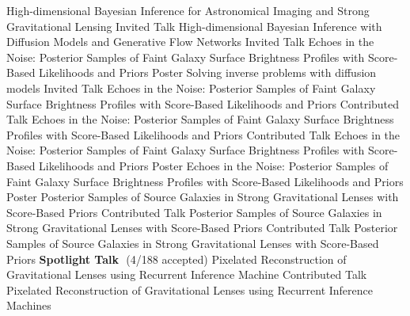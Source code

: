   {High-dimensional Bayesian Inference for Astronomical Imaging and Strong Gravitational Lensing}
  {Invited Talk}
  {High-dimensional Bayesian Inference with Diffusion Models and Generative Flow Networks}
  {Invited Talk}
  {Echoes in the Noise: Posterior Samples of Faint Galaxy Surface Brightness Profiles with Score-Based Likelihoods and Priors}
  {Poster}
  {Solving inverse problems with diffusion models}
  {Invited Talk}
  {Echoes in the Noise: Posterior Samples of Faint Galaxy Surface Brightness Profiles with Score-Based Likelihoods and Priors}
  {Contributed Talk}
  {Echoes in the Noise: Posterior Samples of Faint Galaxy Surface Brightness Profiles with Score-Based Likelihoods and Priors}
  {Contributed Talk}
  {Echoes in the Noise: Posterior Samples of Faint Galaxy Surface Brightness Profiles with Score-Based Likelihoods and Priors}
  {Poster}
  {Echoes in the Noise: Posterior Samples of Faint Galaxy Surface Brightness Profiles with Score-Based Likelihoods and Priors}
  {Poster}
  {Posterior Samples of Source Galaxies in Strong Gravitational Lenses with Score-Based Priors}
  {Contributed Talk}
  {Posterior Samples of Source Galaxies in Strong Gravitational Lenses with Score-Based Priors}
  {Contributed Talk}
  {Posterior Samples of Source Galaxies in Strong Gravitational Lenses with Score-Based Priors}
  {\textbf{Spotlight Talk}\,\, (4/188 accepted)}
  {Pixelated Reconstruction of Gravitational Lenses using Recurrent Inference Machine}
  {Contributed Talk}
  {Pixelated Reconstruction of Gravitational Lenses using Recurrent Inference Machines}
